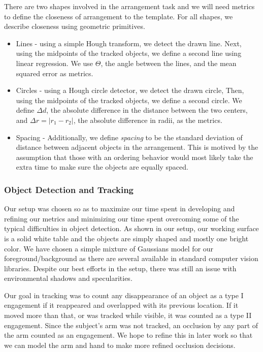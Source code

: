 \documentclass[11pt]{article}
\begin{document}
There are two shapes involved in the arrangement task and we will need metrics to define the closeness of arrangement to the template. For all shapes, we describe closeness using geometric primitives.
\begin{itemize}
	\item{Lines - using a simple Hough transform, we detect the drawn line. Next, using the midpoints of the tracked objects, we define a second line using linear regression. We use $\Theta$, the angle between the lines, and the mean squared error as metrics.\\
}
	\item{Circles - using a Hough circle detector, we detect the drawn circle, Then, using the midpoints of the tracked objects, we define a second circle. We define $\Delta d$, the absolute difference in the distance between the two centers, and $\Delta r = | r_{1} - r_{2} |$, the absolute difference in radii, as the metrics.
}
	\item{Spacing - Additionally, we define {\it spacing} to be the standard deviation of distance between adjacent objects in the arrangement. This is motived by the assumption that those with an ordering behavior would most likely take the extra time to make sure the objects are equally spaced.}
\end{itemize}

\subsubsection{Object Detection and Tracking}
Our setup was chosen so as to maximize our time spent in developing and refining our metrics and minimizing our time spent overcoming some of the typical difficulties in object detection. As shown in our setup, our working surface is a solid white table and the objects are simply shaped and mostly one bright color. We have chosen a simple mixture of Gaussians model for our foreground/background as there are several available in standard computer vision libraries. Despite our best efforts in the setup, there was still an issue with environmental shadows and specularities.

Our goal in tracking was to count any disappearance of an object as a type I engagement if it reappeared and overlapped with its previous location. If it moved more than that, or was tracked while visible, it was counted as a type II engagement. Since the subject's arm was not tracked, an occlusion by any part of the arm counted as an engagement. We hope to refine this in later work so that we can model the arm and hand to make more refined occlusion decisions.
\end{document}
